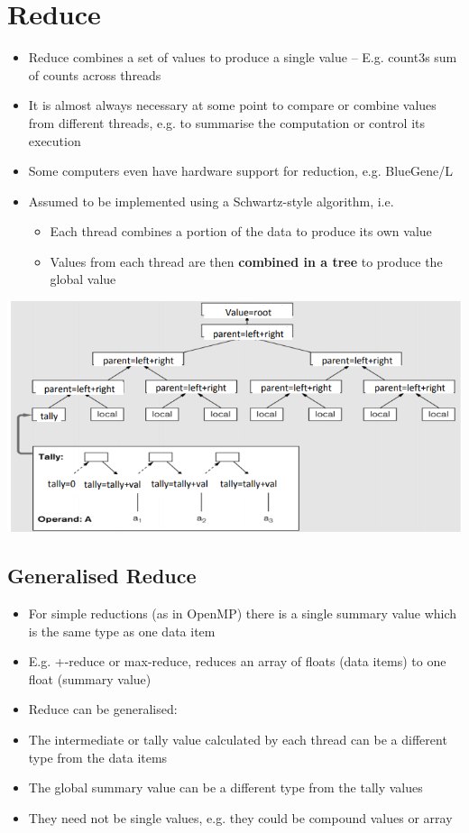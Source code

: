 \documentclass{article}
\begin{document}
\section{Reduce}
\begin{itemize}
  \item Reduce combines a set of values to produce a single value – E.g. count3s sum of counts across threads 
  \item It is almost always necessary at some point to compare or combine values from different threads, e.g. to summarise the computation or control its execution
  \item Some computers even have hardware support for reduction, e.g. BlueGene/L
  \item Assumed to be implemented using a Schwartz-style algorithm, i.e.
  \begin{itemize}
    \item Each thread combines a portion of the data to produce its own value
    \item Values from each thread are then \textbf{combined in a tree} to produce the global value 
  \end{itemize}
\end{itemize}

\begin{center}
  \includegraphics[scale=0.5]{reduce.png}
\end{center}

\subsection{Generalised Reduce}
\begin{itemize}
  \item For simple reductions (as in OpenMP) there is a single summary value which is the same type as one data item
  \item E.g. +-reduce or max-reduce, reduces an array of floats (data items) to one float (summary value) 
  \item Reduce can be generalised: 
  \item The intermediate or tally value calculated by each thread can be a different type from the data items
  \item The global summary value can be a different type from the tally values
  \item They need not be single values, e.g. they could be compound values or array
\end{itemize}
\end{document}
